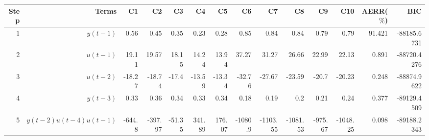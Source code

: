 \begin{tabular}{rrrrrrrrrrrrrr}
Step & Terms & C1 & C2 & C3 & C4 & C5 & C6 & C7 & C8 & C9 & C10 & AERR($\%$) & BIC \\ 
\hline 
1 & $y(t-1)$ & 0.56 & 0.45 & 0.35 & 0.23 & 0.28 & 0.85 & 0.84 & 0.84 & 0.79 & 0.79 & 91.421 & -88185.6731 \\ 
2 & $u(t-1)$ & 19.11 & 19.57 & 18.15 & 14.24 & 13.94 & 37.27 & 31.27 & 26.66 & 22.99 & 22.13 & 0.891 & -88720.4276 \\ 
3 & $u(t-2)$ & -18.27 & -18.74 & -17.4 & -13.59 & -13.34 & -32.76 & -27.67 & -23.59 & -20.7 & -20.23 & 0.248 & -88874.9622 \\ 
4 & $y(t-3)$ & 0.33 & 0.36 & 0.34 & 0.33 & 0.34 & 0.18 & 0.19 & 0.2 & 0.21 & 0.24 & 0.377 & -89129.4509 \\ 
5 & $y(t-2)u(t-4)u(t-1)$ & -644.8 & -397.97 & -51.35 & 341.89 & 176.07 & -1080.9 & -1103.55 & -1081.53 & -975.67 & -1048.25 & 0.098 & -89188.2343 \\ 
\hline 
\end{tabular}